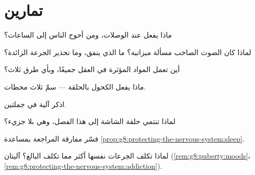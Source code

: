 \section{تمارين}

\begin{exercise}[$\star$]\label{exo:g8:protecting-the-nervous-system:1}
ماذا يفعل  عند الوصلات، ومن أحوج الناس إلى
الساعات؟
\end{exercise}

\begin{exercise}[$\star$]\label{exo:g8:protecting-the-nervous-system:2}
لماذا كان الصوت الصاخب مسألة ميزانية؟ ما الذي ينفق، وما
تحذير الجرعة الزائدة؟
\end{exercise}

\begin{exercise}[$\star$]\label{exo:g8:protecting-the-nervous-system:3}
أين تعمل المواد المؤثرة في العقل جميعًا، وبأي طرق ثلاث؟
\end{exercise}

\begin{exercise}[$\star$]\label{exo:g8:protecting-the-nervous-system:4}
ماذا يفعل الكحول بالحلقة --- سمّ ثلاث محطات.
\end{exercise}

\begin{exercise}[$\star$]\label{exo:g8:protecting-the-nervous-system:5}
اذكر آلية  في جملتين.
\end{exercise}

\begin{exercise}[$\star$]\label{exo:g8:protecting-the-nervous-system:6}
لماذا تنتمي حلقة الشاشة إلى هذا الفصل، وهي بلا جزيء؟
\end{exercise}

\begin{exercise}[$\star\star$]\label{exo:g8:protecting-the-nervous-system:7}
فسّر مفارقة المراجعة بمساعدة
\cref{prop:g8:protecting-the-nervous-system:sleep}.
\end{exercise}

\begin{exercise}[$\star\star$]\label{exo:g8:protecting-the-nervous-system:8}
لماذا تكلف الجرعات نفسها   أكثر مما تكلف
 البالغ؟ آليتان
(\cref{rem:g8:puberty:moods}،
\cref{rem:g8:protecting-the-nervous-system:addiction}).
\end{exercise}

